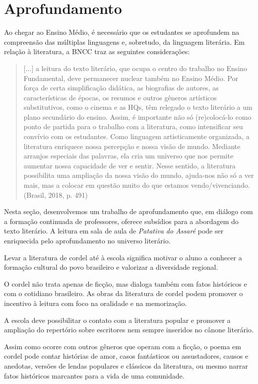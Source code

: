 \documentclass[12pt]{extarticle}
\begin{document}
\section{Aprofundamento}

Ao chegar ao Ensino Médio, é necessário que os estudantes se aprofundem
na compreensão das múltiplas linguagens e, sobretudo, da linguagem
literária. Em relação à literatura, a BNCC traz as seguintes
considerações:

\begin{quote}
{[}...{]} a leitura do texto literário, que ocupa o centro do trabalho
no Ensino Fundamental, deve permanecer nuclear também no Ensino Médio.
Por força de certa simplificação didática, as biografias de autores, as
características de épocas, os resumos e outros gêneros artísticos
substitutivos, como o cinema e as HQs, têm relegado o texto literário a
um plano secundário do ensino. Assim, é importante não só (re)colocá-lo
como ponto de partida para o trabalho com a literatura, como
intensificar seu convívio com os estudantes. Como linguagem
artisticamente organizada, a literatura enriquece nossa percepção e
nossa visão de mundo. Mediante arranjos especiais das palavras, ela cria
um universo que nos permite aumentar nossa capacidade de ver e sentir.
Nesse sentido, a literatura possibilita uma ampliação da nossa visão do
mundo, ajuda-nos não só a ver mais, mas a colocar em questão muito do
que estamos vendo/vivenciando. (Brasil, 2018, p. 491)
\end{quote}

Nesta seção, desenvolvemos um trabalho de aprofundamento que, em diálogo
com a formação continuada de professores, oferece subsídios para a
abordagem do texto literário. A leitura em sala de aula de
\emph{Patativa do Assaré} pode ser enriquecida pelo aprofundamento no
universo literário.

Levar a literatura de cordel até à escola significa motivar o aluno a
conhecer a formação cultural do povo brasileiro e valorizar a
diversidade regional.

O cordel não trata apenas de ficção, mas dialoga também com fatos
históricos e com o cotidiano brasileiro. As obras da literatura de
cordel podem promover o incentivo à leitura com foco na oralidade e na
memorização.

A escola deve possibilitar o contato com a literatura popular e promover
a ampliação do repertório sobre escritores nem sempre inseridos no
cânone literário.

Assim como ocorre com outros gêneros que operam com a ficção, o poema em
cordel pode contar histórias de amor, casos fantásticos ou assustadores,
causos e anedotas, versões de lendas populares e clássicos da
literatura, ou mesmo narrar fatos históricos marcantes para a vida de
uma comunidade.
\end{document}
